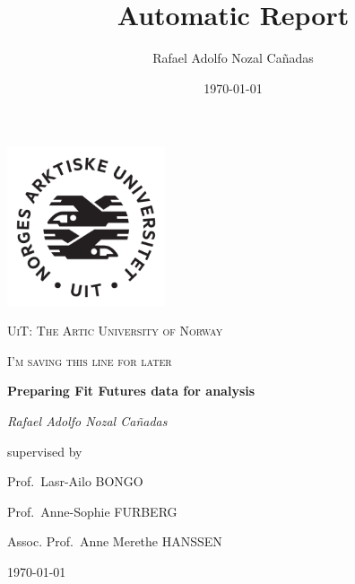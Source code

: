 \documentclass[a4paper,10pt]{report}
\title{Automatic Report}
\author{Rafael Adolfo Nozal Cañadas}
\date{\today}
\begin{document}


\begin{titlepage}
	\centering
	\includegraphics[width=0.35\textwidth]{../../../res/img/logos/UIT_logo_New.jpeg}\par\vspace{1cm}
	{\scshape\LARGE UiT: The Artic University of Norway \par}
	\vspace{1cm}
	{\scshape\Large I'm saving this line for later\par}
	\vspace{1.5cm}
	{\huge\bfseries Preparing Fit Futures data for analysis\par}
	\vspace{2cm}
	{\Large\itshape Rafael Adolfo Nozal Cañadas\par}
	
	\vfill
	
	supervised by
	
    \begin{flushleft}
	\hspace{55mm}    Prof.~Lasr-Ailo \textsc{BONGO}\par
	\hspace{55mm}	 Prof.~Anne-Sophie \textsc{FURBERG}\par
	\hspace{55mm}    Assoc. Prof.~Anne Merethe \textsc{HANSSEN}\par
    \end{flushleft}

	\vfill

	{\large \today\par}
\end{titlepage}



\renewcommand{\familydefault}{\sfdefault}
\end{document}
